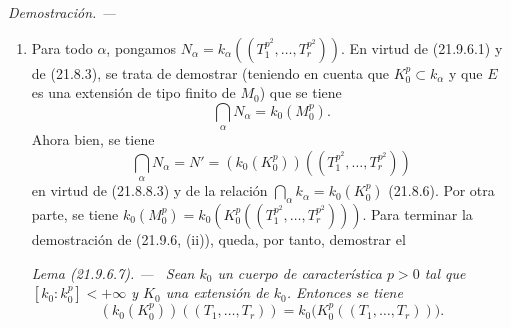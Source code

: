 \documentclass[10pt,oneside]{book}
\makeatletter
\newcommand{\setmanualcurrentlabel}[1]{\def\@currentlabel{#1}}
\newcommand{\oldpage}[2][]{%
  \setcounter{footnote}{0}%
  \marginpar{\scriptsize\textbf{#1}~|~#2}\ignorespaces}
\newenvironment{lemma}[1][]{%
  \setmanualcurrentlabel{#1}\par\medskip\noindent\itshape Lema (#1). ---\ }{\par}
\newenvironment{proof}{%
  \par\medskip\noindent\textit{Demostración. ---\ }}{\par}
\makeatother
\begin{document}
\begin{proof}
\begin{enumerate}
  Se tiene además, por (21.6.4.2),
  \[
    d(E/L_0,M)-d(E/L_0,k_0)=d(E/L_0,M/k_0)
  \]
  y
  \[
    d(L_0/M_0,N)=d(L_0/M_0,N/k)+d(L_0/M_0,k).
  \]
  Pero como $L_0$ es separable sobre $K_0$ (21.9.6.4), se tiene
  $d(L_0/K_0,k)=0$, y por consiguiente también $d(L_0/M_0,k)=0$ ((21.6.2) y
  (21.6.4)). Se obtiene, por tanto,
  \[
    \delta=d(E/L_0,M/k_0)+d(L_0/M_0,N/k).
  \]
  Apliquemos de nuevo dos veces (21.6.4.2) al primer término del segundo
  miembro de esta fórmula; se obtiene
  \[
    d(E/L_0,M/k_0)=d(E/L_0,M/N)+d(E/L_0,N/k)+d(E/L_0,k/k_0).
  \]
  Como $M\subset N(L_0^p)$, se tiene $d(E/L_0,M/N)=0$ (21.6.2), luego (por
  (21.6.4.4))
  \[
    \delta=d(E/L_0,k/k_0)+d(E/M_0,N/k).
  \]
  Pero $M_0$ y $L_0$ son extensiones separables de $K_0$ (21.9.6.4), por lo
  que
  \[
    d(L_0/K_0,k/k_0)=d(M_0/K_0,k/k_0)=0
  \]
  (21.6.2), y aplicando de nuevo dos veces (21.6.4.4),

  \oldpage[0\textsubscript{IV-1}]{181}
  se tiene
  \[
    d(E/L_0,k/k_0)=d(E/K_0,k/k_0)=d(E/M_0,k/k_0),
  \]
  de donde, por una última aplicación de (21.6.4.2),
  \[
    \delta=d(E/M_0,N/k_0)\geqslant0
  \]
  lo que demuestra (21.9.6.1). Además, cuando $k$ se sustituye por una
  subextensión $k'$ de $k_0$, $N$ se sustituye por una subextensión $N'$, por
  lo que $d(E/M_0,N'/k_0)\leqslant d(E/M_0,N/k_0)$ (21.6.4.2), lo que
  demuestra la última afirmación de (i).

  \item[(ii)] Para todo $\alpha$, pongamos
  $N_\alpha=k_\alpha((T_1^{p^2},\ldots,T_r^{p^2}))$. En virtud de (21.9.6.1)
  y de (21.8.3), se trata de demostrar (teniendo en cuenta que
  $K_0^p\subset k_\alpha$ y que $E$ es una extensión de tipo finito de $M_0$)
  que se tiene
  \[
    \bigcap_\alpha N_\alpha=k_0(M_0^p).
  \]
  Ahora bien, se tiene
  \begin{equation}
  \tag{21.9.6.6}
  \label{0.21.9.6.6-es}
    \bigcap_\alpha N_\alpha=N'
    =(k_0(K_0^p))((T_1^{p^2},\ldots,T_r^{p^2}))
  \end{equation}
  en virtud de (21.8.8.3) y de la relación
  $\bigcap_\alpha k_\alpha=k_0(K_0^p)$ (21.8.6). Por otra parte, se tiene
  $k_0(M_0^p)=k_0(K_0^p((T_1^{p^2},\ldots,T_r^{p^2})))$. Para terminar la
  demostración de (21.9.6, (ii)), queda, por tanto, demostrar el

  \begin{lemma}[21.9.6.7]
  \label{0.21.9.6.7-es}
  Sean $k_0$ un cuerpo de característica $p>0$ tal que
  $[k_0:k_0^p]<+\infty$ y $K_0$ una extensión de $k_0$. Entonces se tiene
  \begin{equation}
  \tag{21.9.6.8}
  \label{0.21.9.6.8-es}
    (k_0(K_0^p))((T_1,\ldots,T_r))
    =k_0\bigl(K_0^p((T_1,\ldots,T_r))\bigr).
  \end{equation}
  \end{lemma}


\end{enumerate}
\end{proof}
\end{document}
